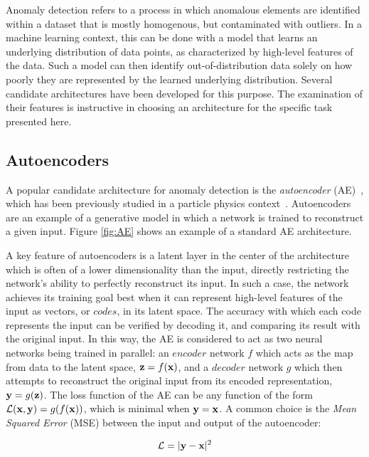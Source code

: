 \documentclass[12pt, a4paper]{article}
\begin{document}
Anomaly detection refers to a process in which anomalous elements are identified within a dataset that is mostly homogenous, but contaminated with outliers. 
In a machine learning context, this can be done with a model that learns an underlying distribution of data points, as characterized by high-level features of the data. 
Such a model can then identify out-of-distribution data solely on how poorly they are represented by the learned underlying distribution. 
Several candidate architectures have been developed for this purpose. 
The examination of their features is instructive in choosing an architecture for the specific task presented here. 


\subsection{Autoencoders}

A popular candidate architecture for anomaly detection is the \textit{autoencoder} 
(AE)~\cite{bank2020autoencoders}, which has been previously studied in a particle physics context~\cite{Farina_2020, Heimel_2019}.
Autoencoders are an example of a generative model in which a network is trained to reconstruct a given input. 
Figure \ref{fig:AE} shows an example of a standard AE architecture.

A key feature of autoencoders is a latent layer in the center of the architecture which is often of a lower dimensionality than the input, directly restricting the network's ability to perfectly reconstruct its input. 
In such a case, the network achieves its training goal best when it can represent high-level features of the input as vectors, or $codes$, in its latent space. 
The accuracy with which each code represents the input can be verified by decoding it, and comparing its result with the original input. 
In this way, the AE is considered to act as two neural networks being trained in parallel: an $encoder$ network $f$
which acts as the map from data to the latent space, ${\textbf z}=f({\textbf x})$, and
a $decoder$ network $g$ which then attempts to reconstruct the original input from 
its encoded representation, ${\textbf y}=g({\textbf z})$. 
The loss function of the AE can be any function of the form $\mathcal{L}({\textbf x}, {\textbf y})=g(f({\textbf x}))$, which 
is minimal when ${\textbf y}={\textbf x}$. 
A common choice is the {\it Mean Squared Error} (MSE)
between the input and output of the autoencoder:

\begin{equation}
\mathcal{L}=|{\textbf y} - {\textbf x}|^2
\end{equation}
\end{document}
